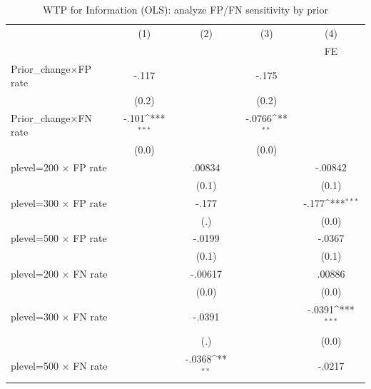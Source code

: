 \begin{table}[htbp]\centering
\def\sym#1{\ifmmode^{#1}\else\(^{#1}\)\fi}
\caption{WTP for Information (OLS): analyze FP/FN sensitivity by prior}
\begin{tabular}{l*{4}{c}}
\hline\hline
                &\multicolumn{1}{c}{(1)}&\multicolumn{1}{c}{(2)}&\multicolumn{1}{c}{(3)}&\multicolumn{1}{c}{(4)}\\
                &\multicolumn{1}{c}{}&\multicolumn{1}{c}{}&\multicolumn{1}{c}{}&\multicolumn{1}{c}{FE}\\
\hline
Prior\_change$\times$FP rate&    -.117         &                  &    -.175         &                  \\
                &    (0.2)         &                  &    (0.2)         &                  \\
Prior\_change$\times$FN rate&    -.101\sym{***}&                  &   -.0766\sym{**} &                  \\
                &    (0.0)         &                  &    (0.0)         &                  \\
plevel=200 $\times$ FP rate&                  &   .00834         &                  &  -.00842         \\
                &                  &    (0.1)         &                  &    (0.1)         \\
plevel=300 $\times$ FP rate&                  &    -.177         &                  &    -.177\sym{***}\\
                &                  &      (.)         &                  &    (0.0)         \\
plevel=500 $\times$ FP rate&                  &   -.0199         &                  &   -.0367         \\
                &                  &    (0.1)         &                  &    (0.1)         \\
plevel=200 $\times$ FN rate&                  &  -.00617         &                  &   .00886         \\
                &                  &    (0.0)         &                  &    (0.0)         \\
plevel=300 $\times$ FN rate&                  &   -.0391         &                  &   -.0391\sym{***}\\
                &                  &      (.)         &                  &    (0.0)         \\
plevel=500 $\times$ FN rate&                  &   -.0368\sym{**} &                  &   -.0217         \\

\end{tabular}
\end{table}
